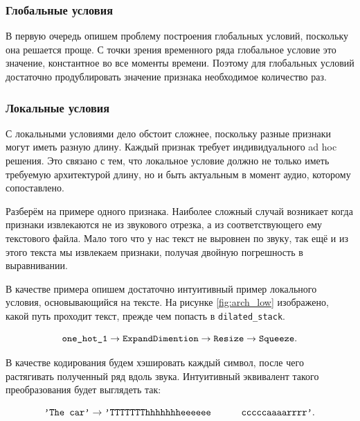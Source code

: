 \documentclass[../diploma.tex]{subfiles}
\begin{document}
\subsubsection{Глобальные условия}

В первую очередь опишем проблему построения глобальных условий, поскольку она решается проще. С точки зрения временного ряда глобальное условие это значение, константное во все моменты времени. Поэтому для глобальных условий достаточно продублировать значение признака необходимое количество раз.

\subsubsection{Локальные условия}

С локальными условиями дело обстоит сложнее, поскольку разные признаки могут иметь разную длину. Каждый признак требует индивидуального ad hoc решения. Это связано с тем, что локальное условие должно не только иметь требуемую архитектурой длину, но и быть актуальным в момент аудио, которому сопоставлено.

Разберём на примере одного признака.
Наиболее сложный случай возникает когда признаки извлекаются не из звукового отрезка, а из соответствующего ему текстового файла. Мало того что у нас текст не выровнен по звуку, так ещё и из этого текста мы извлекаем признаки, получая двойную погрешность в выравнивании.

В качестве примера опишем достаточно интуитивный пример локального условия, основывающийся на тексте.
На рисунке \ref{fig:arch_low} изображено, какой путь проходит текст, прежде чем попасть в \verb|dilated_stack|.

$$
\verb|one_hot_1| \rightarrow \verb|ExpandDimention| \rightarrow \verb|Resize| \rightarrow \verb|Squeeze|.
$$

В качестве кодирования будем хэшировать каждый символ, после чего растягивать полученный ряд вдоль звука. 
Интуитивный эквивалент такого преобразования будет выглядеть так:

$$
\verb|'The car'| \rightarrow \verb|'TTTTTTThhhhhhheeeeee      cccccaaaarrrr'|.
$$
\end{document}
